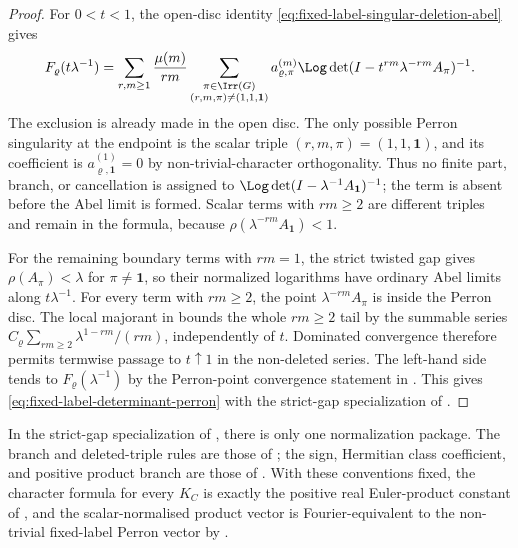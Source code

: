 \begin{proof}
  For \(0<t<1\), the open-disc identity
  \eqref{eq:fixed-label-singular-deletion-abel} gives
  \[
    F_\varrho(t\lambda^{-1})
    =
    \sum_{r,m\ge1}\frac{\mu(m)}{rm}
      \sum_{\substack{\pi\in\Irr(G)\\(r,m,\pi)\neq(1,1,\mathbf1)}}
        a_{\varrho,\pi}^{(m)}
        \Log\det(I-t^{rm}\lambda^{-rm}A_\pi)^{-1}.
  \]
  The exclusion is already made in the open disc.  The only possible Perron
  singularity at the endpoint is the scalar triple
  \((r,m,\pi)=(1,1,\mathbf1)\), and its coefficient is
  \(a_{\varrho,\mathbf1}^{(1)}=0\) by non-trivial-character orthogonality.
  Thus no finite part, branch, or cancellation is assigned to
  \(\Log\det(I-\lambda^{-1}A_{\mathbf1})^{-1}\); the term is absent before
  the Abel limit is formed.  Scalar terms with \(rm\ge2\) are different
  triples and remain in the formula, because
  \(\rho(\lambda^{-rm}A_{\mathbf1})<1\).

  For the remaining boundary terms with \(rm=1\), the strict twisted gap gives
  \(\rho(A_\pi)<\lambda\) for \(\pi\ne\mathbf1\), so their normalized logarithms
  have ordinary Abel limits along \(t\lambda^{-1}\).  For every term with
  \(rm\ge2\), the point \(\lambda^{-rm}A_\pi\) is inside the Perron disc.  The
  local majorant in  bounds
  the whole \(rm\ge2\) tail by the summable series
  \(C_\varrho\sum_{rm\ge2}\lambda^{1-rm}/(rm)\), independently of \(t\).
  Dominated convergence therefore permits termwise passage to
  \(t\uparrow1\) in the non-deleted series.  The left-hand side tends to
  \(F_\varrho(\lambda^{-1})\) by the Perron-point convergence statement in
  .  This gives
  \eqref{eq:fixed-label-determinant-perron} with the strict-gap specialization
  of .
\end{proof}

\begin{remark}\label{cor:main-iii-convention-compatibility}
  In the strict-gap specialization of
  ,
  there is only one normalization package.  The branch and deleted-triple
  rules are those of ; the sign,
  Hermitian class coefficient, and positive product branch are those of
  .  With these
  conventions fixed, the character formula for every \(K_C\) is exactly the
  positive real Euler-product constant of
  , and the scalar-normalised product
  vector is Fourier-equivalent to the non-trivial fixed-label Perron vector by
  .
\end{remark}

